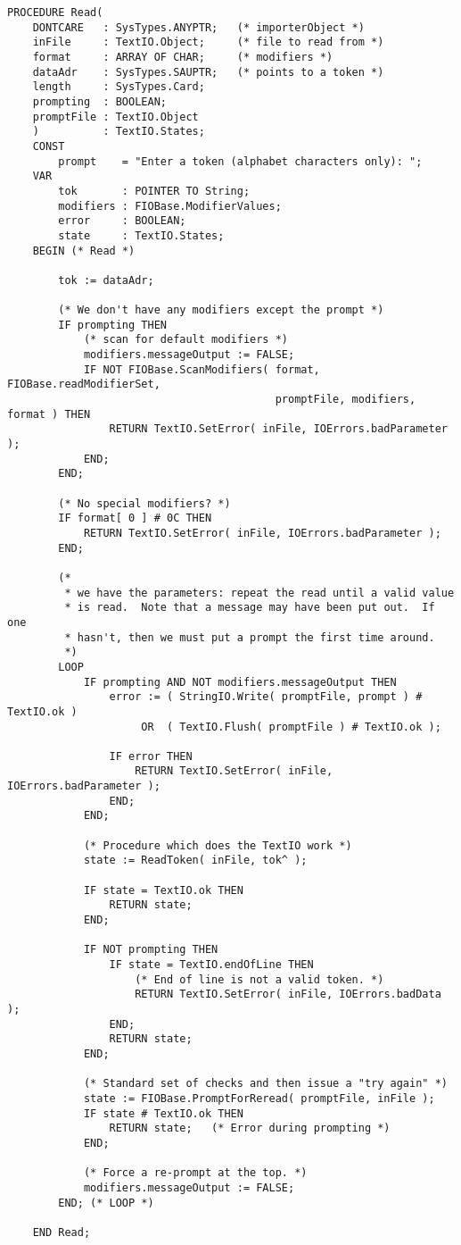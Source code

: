 \begin{verbatim}
PROCEDURE Read(
    DONTCARE   : SysTypes.ANYPTR;   (* importerObject *)
    inFile     : TextIO.Object;     (* file to read from *)
    format     : ARRAY OF CHAR;     (* modifiers *)
    dataAdr    : SysTypes.SAUPTR;   (* points to a token *)
    length     : SysTypes.Card;
    prompting  : BOOLEAN;
    promptFile : TextIO.Object
    )          : TextIO.States;
    CONST
        prompt    = "Enter a token (alphabet characters only): ";
    VAR
        tok       : POINTER TO String;
        modifiers : FIOBase.ModifierValues;
        error     : BOOLEAN;
        state     : TextIO.States;
    BEGIN (* Read *)

        tok := dataAdr;

        (* We don't have any modifiers except the prompt *)
        IF prompting THEN
            (* scan for default modifiers *)
            modifiers.messageOutput := FALSE;   
            IF NOT FIOBase.ScanModifiers( format, FIOBase.readModifierSet,
                                          promptFile, modifiers, format ) THEN
                RETURN TextIO.SetError( inFile, IOErrors.badParameter );
            END;
        END;

        (* No special modifiers? *)
        IF format[ 0 ] # 0C THEN
            RETURN TextIO.SetError( inFile, IOErrors.badParameter );
        END;

        (* 
         * we have the parameters: repeat the read until a valid value
         * is read.  Note that a message may have been put out.  If one
         * hasn't, then we must put a prompt the first time around.
         *)
        LOOP  
            IF prompting AND NOT modifiers.messageOutput THEN
                error := ( StringIO.Write( promptFile, prompt ) # TextIO.ok )
                     OR  ( TextIO.Flush( promptFile ) # TextIO.ok );

                IF error THEN
                    RETURN TextIO.SetError( inFile, IOErrors.badParameter );
                END;
            END;

            (* Procedure which does the TextIO work *)
            state := ReadToken( inFile, tok^ );

            IF state = TextIO.ok THEN
                RETURN state;
            END;

            IF NOT prompting THEN
                IF state = TextIO.endOfLine THEN
                    (* End of line is not a valid token. *)
                    RETURN TextIO.SetError( inFile, IOErrors.badData );
                END;
                RETURN state;
            END;

            (* Standard set of checks and then issue a "try again" *)
            state := FIOBase.PromptForReread( promptFile, inFile );
            IF state # TextIO.ok THEN
                RETURN state;   (* Error during prompting *)
            END;

            (* Force a re-prompt at the top. *)
            modifiers.messageOutput := FALSE;
        END; (* LOOP *)

    END Read;   
\end{verbatim}

